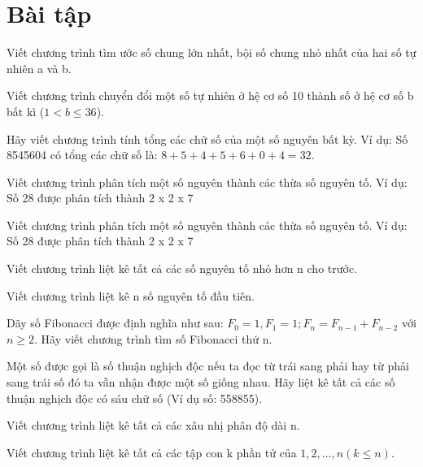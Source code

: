 \section{Bài tập}

\begin{exlist}
\item Viết chương trình tìm ước số chung lớn nhất, bội số chung nhỏ nhất của hai số tự nhiên a và b.

\item Viết chương trình chuyển đổi một số tự nhiên ở hệ cơ số 10 thành số ở hệ cơ số b bất kì ($1 < b \leq 36$).

\item Hãy viết chương trình tính tổng các chữ số của một số nguyên bất kỳ. Ví dụ: Số 8545604 có tổng các chữ số là: $8+5+4+5+6+0+4= 32$.

\item Viết chương trình phân tích một số nguyên thành các thừa số nguyên tố. Ví dụ: Số 28 được phân tích thành 2 x 2 x 7

\item Viết chương trình phân tích một số nguyên thành các thừa số nguyên tố. Ví dụ: Số 28 được phân tích thành 2 x 2 x 7

\item Viết chương trình liệt kê tất cả các số nguyên tố nhỏ hơn n cho trước.

\item Viết chương trình liệt kê n số nguyên tố đầu tiên.

\item Dãy số Fibonacci được định nghĩa như sau: $F_0 =1, F_1 = 1; F_n = F_{n-1} + F_{n-2}$ với $n\geq2$. Hãy viết chương trình tìm số Fibonacci thứ n.

\item Một số được gọi là số thuận nghịch độc nếu ta đọc từ trái sang phải hay từ phải sang trái số đó ta vẫn nhận được một số giống nhau. Hãy liệt kê tất cả các số thuận nghịch độc có sáu chữ số (Ví dụ số: 558855).

\item Viết chương trình liệt kê tất cả các xâu nhị phân độ dài n.

\item Viết chương trình liệt kê tất cả các tập con k phần tử của $1, 2, ..., n (k \leq n)$.
\end{exlist}
